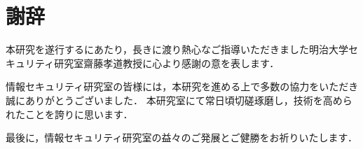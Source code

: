 \newpage
\section*{謝辞}
本研究を遂行するにあたり，長きに渡り熱心なご指導いただきました明治大学セキュリティ研究室齋藤孝道教授に心より感謝の意を表します．

情報セキュリティ研究室の皆様には，本研究を進める上で多数の協力をいただき誠にありがとうございました．
本研究室にて常日頃切磋琢磨し，技術を高められたことを誇りに思います．

最後に，情報セキュリティ研究室の益々のご発展とご健勝をお祈りいたします．
